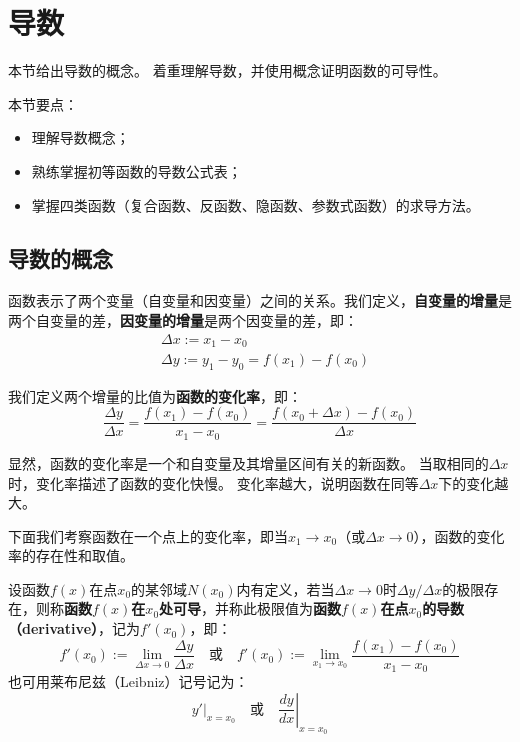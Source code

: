 \section{导数}

本节给出导数的概念。
着重理解导数，并使用概念证明函数的可导性。

本节要点：
\begin{itemize}
    \item 理解导数概念；
    \item 熟练掌握初等函数的导数公式表；
    \item 掌握四类函数（复合函数、反函数、隐函数、参数式函数）的求导方法。
\end{itemize}

\subsection{导数的概念}

\begin{definition}[增量]
函数表示了两个变量（自变量和因变量）之间的关系。我们定义，{\bf 自变量的增量}是两个自变量的差，{\bf 因变量的增量}是两个因变量的差，即：
\begin{align*}
&\Delta x:=x_1-x_0 \\
&\Delta y:=y_1-y_0=f\left( x_1 \right) -f\left( x_0 \right)
\end{align*}
\end{definition}

\begin{definition}[变化率]
我们定义两个增量的比值为{\bf 函数的变化率}，即：
\[
\frac{\Delta y}{\Delta x}=\frac{f\left( x_1 \right) -f\left( x_0 \right)}{x_1-x_0}=\frac{f\left( x_0+\Delta x \right) -f\left( x_0 \right)}{\Delta x}
\]
\end{definition}

显然，函数的变化率是一个和自变量及其增量区间有关的新函数。
当取相同的$\Delta x$时，变化率描述了函数的变化快慢。
变化率越大，说明函数在同等$\Delta x$下的变化越大。

下面我们考察函数在一个点上的变化率，即当$x_1\rightarrow x_0$（或$\Delta x\rightarrow 0$），函数的变化率的存在性和取值。

\begin{definition}[导数]
设函数$f\left( x \right) $在点$x_0$的某邻域$N\left( x_0 \right) $内有定义，若当$\Delta x\rightarrow 0$时$\Delta y/\Delta x$的极限存在，则称{\bf 函数$f\left( x \right) $在$x_0$处可导}，并称此极限值为{\bf 函数$f\left( x \right) $在点$x_0$的导数（derivative）}，记为$f'\left( x_0 \right) $，即：
\[
f'\left( x_0 \right) :=\underset{\Delta x\rightarrow 0}{\lim}\frac{\Delta y}{\Delta x} \quad \text{或} \quad f'\left( x_0 \right) :=\underset{x_1\rightarrow x_0}{\lim}\frac{f\left( x_1 \right) -f\left( x_0 \right)}{x_1-x_0}
\]
也可用莱布尼兹（Leibniz）记号记为：
\[
\left. y' \right|_{x=x_0} \quad \text{或} \quad \left. \frac{dy}{dx} \right|_{x=x_0}
\]
\end{definition}

